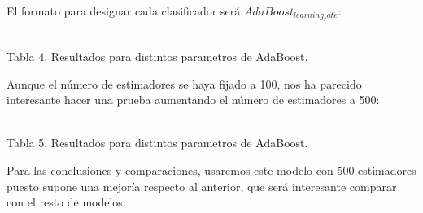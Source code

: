 \documentclass{article}
\begin{document}
El formato para designar cada clasificador será \(AdaBoost_{learning_rate}\):
\begin{table}[H]
\centering
{}
  \footnotesize{~\\ Tabla 4. Resultados para distintos parametros de AdaBoost.}
\end{table}

Aunque el número de estimadores se haya fijado a 100, nos ha parecido interesante hacer una prueba aumentando el número de estimadores a 500:
\begin{table}[H]
\centering
{}
  \footnotesize{~\\ Tabla 5. Resultados para distintos parametros de AdaBoost.}
\end{table}
Para las conclusiones y comparaciones, usaremos este modelo con 500 estimadores puesto supone una mejoría respecto al anterior, que será interesante comparar con el resto de modelos.
\end{document}
